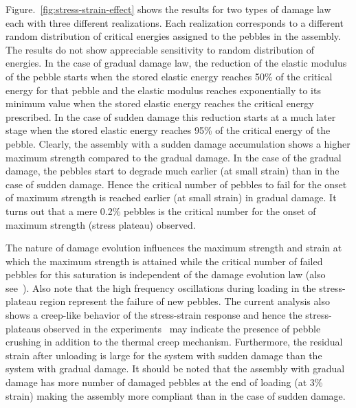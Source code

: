 Figure.~\ref{fig:stress-strain-effect} shows the results for two types of damage law each with three different realizations. Each realization corresponds to a different random distribution of critical energies assigned to the pebbles in the assembly. The results do not show appreciable sensitivity to random distribution of energies. In the case of gradual damage law, the reduction of the elastic modulus of the pebble starts when the stored elastic energy reaches 50\% of the critical energy for that pebble and the elastic modulus reaches exponentially to its minimum value when the stored elastic energy reaches the critical energy prescribed. In the case of sudden damage this reduction starts at a much later stage when the stored elastic energy reaches 95\% of the critical energy of the pebble. Clearly, the assembly with a sudden damage accumulation shows a higher maximum strength compared to the gradual damage. In the case of the gradual damage, the pebbles start to degrade much earlier (at small strain) than in the case of sudden damage. Hence the critical number of pebbles to fail for the onset of maximum strength is reached earlier (at small strain) in gradual damage. It turns out that a mere 0.2\% pebbles is the critical number for the onset of maximum strength (stress plateau) observed. 

The nature of damage evolution influences the maximum strength and strain at which the maximum strength is attained while the critical number of failed pebbles for this saturation is independent of the damage evolution law (also see~\cite{Zhao2010}). Also note that the high frequency oscillations during loading in the stress-plateau region represent the failure of new pebbles. The current analysis also shows a creep-like behavior of the stress-strain response and hence the stress-plateaus observed in the experiments~\cite{Reimann:2000tw} may indicate the presence of pebble crushing in addition to the thermal creep mechanism. Furthermore, the residual strain after unloading is large for the system with sudden damage than the system with gradual damage. It should be noted that the assembly with gradual damage has more number of damaged pebbles at the end of loading (at 3\% strain) making the assembly more compliant than in the case of sudden damage. 


